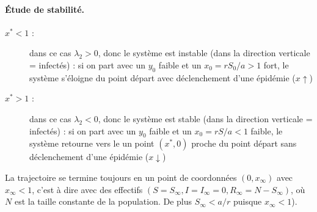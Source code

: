 \paragraph*{\'Etude de stabilité.}
\begin{description}
  \item[$x^* < 1$ :] dans ce cas $\lambda_2 > 0$, donc le système est instable (dans la direction verticale = infectés) : si on part avec un $y_0$ faible et un $x_0 = rS_0/a > 1$ fort, le système s'éloigne du point départ avec déclenchement d'une épidémie ($x \uparrow$)
  \item[$x^* > 1$ :] dans ce cas $\lambda_2 < 0$, donc le système est stable (dans la direction verticale = infectés) : si on part avec un $y_0$ faible et un $x_0 = rS/a < 1$ faible, le système retourne vers le un point $(x^*, 0)$ proche du point départ sans déclenchement d'une épidémie ($x \downarrow$)
\end{description}


La trajectoire se termine toujours en un point de coordonnées $(0, x_\infty)$ avec $x_\infty < 1$, c'est à dire avec des effectifs $(S = S_\infty, I = I_\infty = 0, R_\infty = N - S_\infty)$, où $N$ est la taille constante de la population. De plus $S_\infty < a/r$ puisque $x_\infty < 1$).



